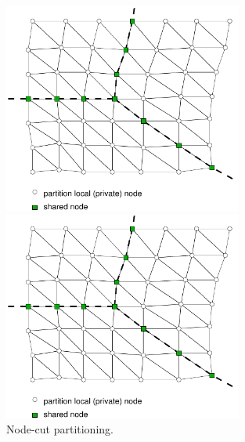 \documentclass[a4paper]{article}
\begin{document}
\begin{figure}[htb]
\begin{htmlonly}
  \centerline{\includegraphics[width=0.7\textwidth]{nodecut0cb}}
\end{htmlonly}
\centerline{\includegraphics[width=0.7\textwidth]{nodecut0cb}}
\caption{Node-cut partitioning.}
\label{nodecut}
\end{figure}
\end{document}
